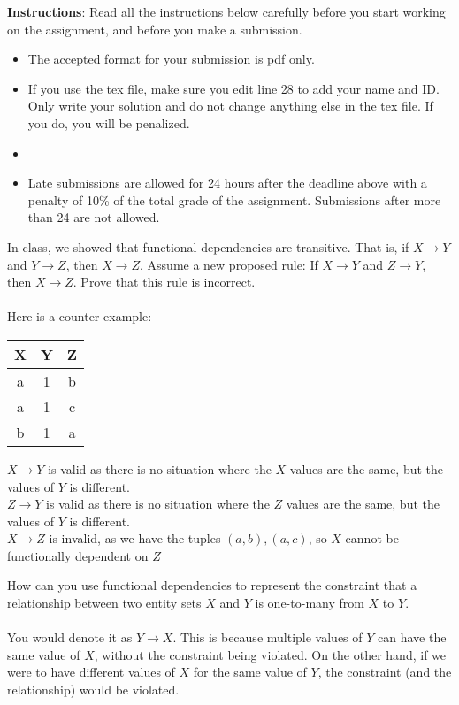 \documentclass[a4 paper]{article}
\begin{document}
\textbf{Instructions}: Read all the instructions below carefully before you start working on the assignment, and before you make a submission.
\begin{itemize}
    \item The accepted format for your submission is pdf only.
    \item If you use the tex file, make sure you edit line 28 to add your name and ID. Only write your solution and do not change anything else in the tex file. If you do, you will be penalized.
    \item \item Late submissions are allowed for 24 hours after the deadline above with a penalty of 10\% of the total grade of the assignment. Submissions after more than 24 are not allowed.
\end{itemize}

In class, we showed that functional dependencies are transitive. That is, if $X \rightarrow Y$ and $Y \rightarrow Z$, then $X \rightarrow Z$. Assume a new proposed rule: If $X \rightarrow Y$ and $Z \rightarrow Y$, then $X \rightarrow Z$. Prove that this rule is incorrect.\\\\
Here is a counter example:
\begin{center}
  \begin{tabular}{|c|c|c|}
   \hline
    X & Y & Z\\ [0.5ex]
   \hline\hline
   a & 1 & b\\
   \hline
   a & 1 & c\\
   \hline
   b & 1 & a\\
   \hline
  \end{tabular}
\end{center}
$X\rightarrow Y$ is valid as there is no situation where the $X$ values are the same, but the values of $Y$ is different.\\
$Z\rightarrow Y$ is valid as there is no situation where the $Z$ values are the same, but the values of $Y$ is different.\\
$X\rightarrow Z$ is invalid, as we have the tuples $(a,b),(a,c)$, so $X$ cannot be functionally dependent on $Z$



How can you use functional dependencies to represent the constraint that a relationship between two entity sets $X$ and $Y$ is one-to-many from $X$ to $Y$.\\\\
You would denote it as $Y\rightarrow X$. This is because multiple values of $Y$ can have the same value of $X$, without the constraint being violated. On the other hand, if we were to have different values of $X$ for the same value of $Y$, the constraint (and the relationship) would be violated.
\end{document}
